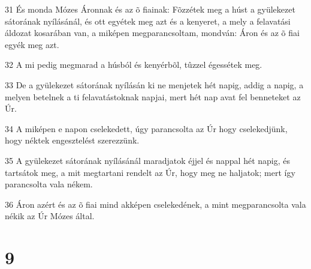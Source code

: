 \par 31 És monda Mózes Áronnak és az õ fiainak: Fõzzétek meg a húst a gyülekezet sátorának nyílásánál, és ott egyétek meg azt és a kenyeret, a mely a felavatási áldozat kosarában van, a miképen megparancsoltam, mondván: Áron és az õ fiai egyék meg azt.
\par 32 A mi pedig megmarad a húsból és kenyérbõl, tûzzel égessétek meg.
\par 33 De a gyülekezet sátorának nyílásán ki ne menjetek hét napig, addig a napig, a melyen betelnek a ti felavatástoknak napjai, mert hét nap avat fel benneteket az Úr.
\par 34 A miképen e napon cselekedett, úgy parancsolta az Úr hogy cselekedjünk, hogy néktek engesztelést szerezzünk.
\par 35 A gyülekezet sátorának nyílásánál maradjatok éjjel és nappal hét napig, és tartsátok meg, a mit megtartani rendelt az Úr, hogy meg ne haljatok; mert így parancsolta vala nékem.
\par 36 Áron azért és az õ fiai mind akképen cselekedének, a mint megparancsolta vala nékik az Úr Mózes által.

\chapter{9}

